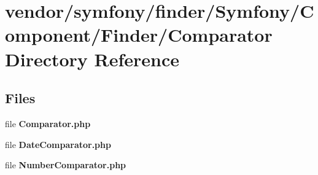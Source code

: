 \section{vendor/symfony/finder/\+Symfony/\+Component/\+Finder/\+Comparator Directory Reference}
\label{dir_7c962742707e80c4a490bf50926279a3}
\subsection*{Files}
\begin{DoxyCompactItemize}
\item 
file {\bf Comparator.\+php}
\item 
file {\bf Date\+Comparator.\+php}
\item 
file {\bf Number\+Comparator.\+php}
\end{DoxyCompactItemize}
